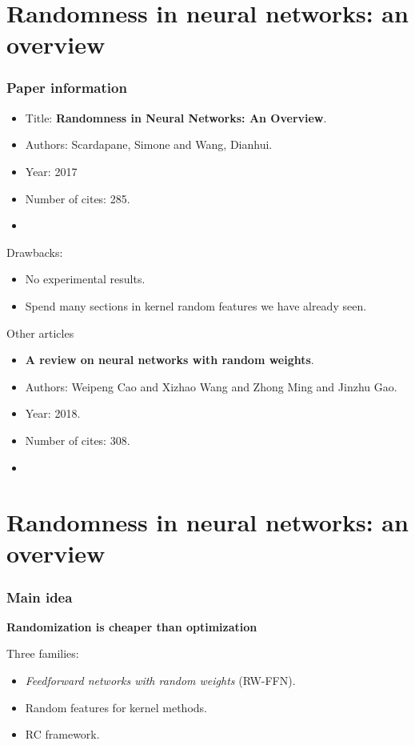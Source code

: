 \section{Randomness in neural networks: an overview}

\begin{frame}
    \frametitle{Paper information}

    \begin{itemize}
        \item Title: \textbf{Randomness in Neural Networks: An Overview}. 
        \item Authors:  Scardapane, Simone and Wang, Dianhui. 
        \item Year: 2017
        \item Number of cites: 285.
        \item \cite{randomness-in-neural-networks}
    \end{itemize}

    Drawbacks: 
    \begin{itemize}
        \item No experimental results. 
        \item Spend many sections in kernel random features we have already seen. 
    \end{itemize}
    
\end{frame}

\begin{frame}{Other articles}
    \begin{itemize}
        \item \textbf{A review on neural networks with random weights}. 
        \item Authors:  Weipeng Cao and Xizhao Wang and Zhong Ming and Jinzhu Gao.
        \item Year: 2018. 
        \item Number of cites: 308. 
        \item \cite{a-review-neural-network-with-random-weights}
    \end{itemize}
    
\end{frame}

\section{Randomness in neural networks: an overview}

\begin{frame}
    \frametitle{Main idea}

    \textbf{Randomization is cheaper than optimization}

    Three families: 
    \begin{itemize}
        \item \textit{Feedforward networks with random weights} (RW-FFN). 
        \item Random features for kernel methods.
        \item RC framework. 
    \end{itemize}

\end{frame}


